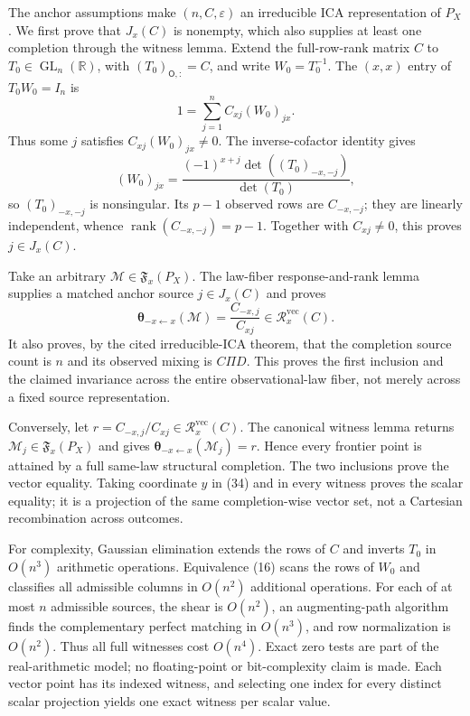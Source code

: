 The anchor assumptions make \((n,C,\varepsilon)\) an irreducible ICA representation of \(P_X\). We first prove that \(J_x(C)\) is nonempty, which also supplies at least one completion through the witness lemma. Extend the full-row-rank matrix \(C\) to \(T_0\in\operatorname{GL}_n(\mathbb R)\), with \((T_0)_{\mathsf O,:}=C\), and write \(W_0=T_0^{-1}\). The \((x,x)\) entry of \(T_0W_0=I_n\) is
\[
 1=\sum_{j=1}^n C_{xj}(W_0)_{jx}. \tag{32}
\]
Thus some \(j\) satisfies \(C_{xj}(W_0)_{jx}\ne0\). The inverse-cofactor identity gives
\[
 (W_0)_{jx}=\frac{(-1)^{x+j}\det((T_0)_{-x,-j})}{\det(T_0)}, \tag{33}
\]
so \((T_0)_{-x,-j}\) is nonsingular. Its \(p-1\) observed rows are \(C_{-x,-j}\); they are linearly independent, whence \(\operatorname{rank}(C_{-x,-j})=p-1\). Together with \(C_{xj}\ne0\), this proves \(j\in J_x(C)\).

Take an arbitrary \(\mathcal M\in\mathfrak F_x(P_X)\). The law-fiber response-and-rank lemma supplies a matched anchor source \(j\in J_x(C)\) and proves
\[
 \boldsymbol\theta_{-x\leftarrow x}(\mathcal M)
 =\frac{C_{-x,j}}{C_{xj}}
 \in\mathcal R_x^{\mathrm{vec}}(C). \tag{34}
\]
It also proves, by the cited irreducible-ICA theorem, that the completion source count is \(n\) and its observed mixing is \(C\Pi D\). This proves the first inclusion and the claimed invariance across the entire observational-law fiber, not merely across a fixed source representation.

Conversely, let \(r=C_{-x,j}/C_{xj}\in\mathcal R_x^{\mathrm{vec}}(C)\). The canonical witness lemma returns \(\mathcal M_j\in\mathfrak F_x(P_X)\) and gives \(\boldsymbol\theta_{-x\leftarrow x}(\mathcal M_j)=r\). Hence every frontier point is attained by a full same-law structural completion. The two inclusions prove the vector equality. Taking coordinate \(y\) in (34) and in every witness proves the scalar equality; it is a projection of the same completion-wise vector set, not a Cartesian recombination across outcomes.

For complexity, Gaussian elimination extends the rows of \(C\) and inverts \(T_0\) in \(O(n^3)\) arithmetic operations. Equivalence (16) scans the rows of \(W_0\) and classifies all admissible columns in \(O(n^2)\) additional operations. For each of at most \(n\) admissible sources, the shear is \(O(n^2)\), an augmenting-path algorithm finds the complementary perfect matching in \(O(n^3)\), and row normalization is \(O(n^2)\). Thus all full witnesses cost \(O(n^4)\). Exact zero tests are part of the real-arithmetic model; no floating-point or bit-complexity claim is made. Each vector point has its indexed witness, and selecting one index for every distinct scalar projection yields one exact witness per scalar value.